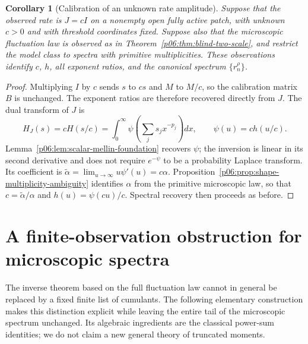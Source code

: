 \documentclass[11pt,letterpaper]{article}
\newtheorem{corollary}[theorem]{Corollary}
\theoremstyle{definition}
\theoremstyle{remark}
\newcommand{\1}{\mathbf 1}
\begin{document}
\begin{corollary}[Calibration of an unknown rate amplitude]
\label{p06:cor:unknown-rate-amplitude}
Suppose that the observed rate is $J=cI$ on a nonempty open fully
active patch, with unknown $c>0$ and with threshold coordinates fixed.
Suppose also that the microscopic fluctuation law is observed as in
Theorem~\ref{p06:thm:blind-two-scale}, and restrict the model class to
spectra with primitive multiplicities.  These observations identify
$c$, $h$, all exponent ratios,
and the canonical spectrum $\{r_n^\rho\}$.
\end{corollary}

\begin{proof}
Multiplying $I$ by $c$ sends $s$ to $cs$ and $M$ to $M/c$,
so the calibration matrix $B$ is unchanged.  The exponent ratios
are therefore recovered directly from $J$.  The dual transform of
$J$ is
\[
 H_J(s)=cH(s/c)
 =\int_0^\infty\psi\left(\sum_j s_jx^{-p_j}\right)dx,
 \qquad \psi(u)=ch(u/c).
\]
Lemma~\ref{p06:lem:scalar-mellin-foundation} recovers
$\psi$; the inversion is linear in its second derivative and does
not require $e^{-\psi}$ to be a probability Laplace transform.
Its coefficient is
$\widetilde\alpha=\lim_{u\to\infty}u\psi'(u)=c\alpha$.
Proposition~\ref{p06:prop:shape-multiplicity-ambiguity} identifies
$\alpha$ from the primitive microscopic law, so that
$c=\widetilde\alpha/\alpha$ and
$h(u)=\psi(cu)/c$.  Spectral recovery then proceeds as before.
\end{proof}


\section{A finite-observation obstruction for microscopic spectra}
\label{p06:sec:finite-cumulant-obstruction}

The inverse theorem based on the full fluctuation law cannot in general
be replaced by a fixed finite list of cumulants.  The following elementary
construction makes this distinction explicit while leaving the entire
tail of the microscopic spectrum unchanged.  Its algebraic ingredients
are the classical power-sum identities; we do not claim a new general
theory of truncated moments.
\end{document}
